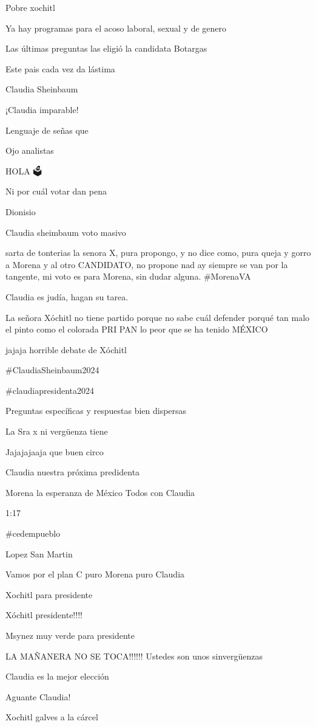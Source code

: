 Pobre xochitl

Ya hay programas para el acoso laboral, sexual y de genero

Las últimas preguntas las eligió la candidata Botargas

Este pais cada vez da lástima

Claudia Sheinbaum 🥰

¡Claudia imparable!

Lenguaje de señas que

Ojo analistas

HOLA 🗳️

Ni por cuál votar dan pena

Dionisio

Claudia sheimbaum voto masivo

sarta de tonterias la senora X, pura propongo, y no dice como, pura queja y gorro a Morena y al otro CANDIDATO, no propone nad ay siempre se van por la tangente, mi voto es para Morena, sin dudar alguna. #MorenaVA

Claudia es judía, hagan su tarea.

La señora Xóchitl no tiene partido  porque no sabe cuál defender porqué tan malo el pinto como el colorada PRI  PAN lo peor que se ha tenido MÉXICO

jajaja horrible debate de Xóchitl

#ClaudiaSheinbaum2024

#claudiapresidenta2024

Preguntas específicas y respuestas bien dispersas

La Sra x ni vergüenza tiene

Jajajajaaja que buen circo

Claudia nuestra próxima predidenta

Morena la esperanza de México
Todos con Claudia

1:17

#cedempueblo

Lopez San Martin 🐀

Vamos por el plan C puro Morena puro Claudia

Xochitl para presidente

Xóchitl presidente!!!!

Msynez muy verde para presidente

LA MAÑANERA NO SE TOCA!!!!!! Ustedes son unos sinvergüenzas

Claudia es la mejor elección

Aguante Claudia!

Xochitl galves a la cárcel

